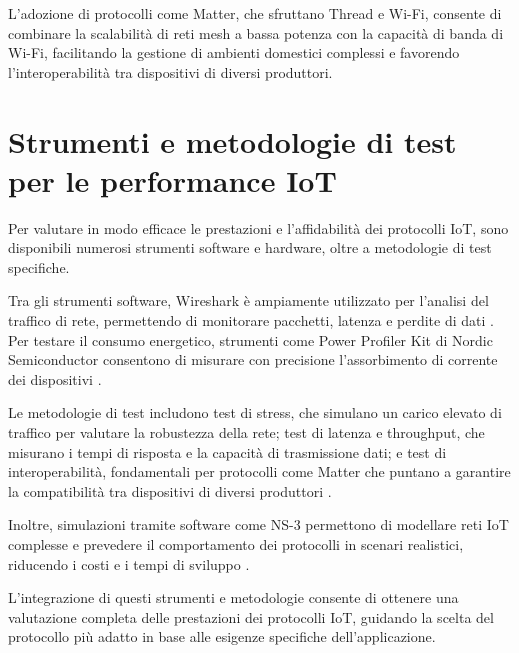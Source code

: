 L’adozione di protocolli come Matter, che sfruttano Thread e Wi-Fi, consente di combinare la scalabilità di reti mesh a bassa potenza con la capacità di banda di Wi-Fi, facilitando la gestione di ambienti domestici complessi e favorendo l’interoperabilità tra dispositivi di diversi produttori.

\section{Strumenti e metodologie di test per le performance IoT}
Per valutare in modo efficace le prestazioni e l’affidabilità dei protocolli IoT, sono disponibili numerosi strumenti software e hardware, oltre a metodologie di test specifiche.

Tra gli strumenti software, Wireshark è ampiamente utilizzato per l’analisi del traffico di rete, permettendo di monitorare pacchetti, latenza e perdite di dati \cite{WiresharkTool}. Per testare il consumo energetico, strumenti come Power Profiler Kit di Nordic Semiconductor consentono di misurare con precisione l’assorbimento di corrente dei dispositivi \cite{PowerProfiler}.

Le metodologie di test includono test di stress, che simulano un carico elevato di traffico per valutare la robustezza della rete; test di latenza e throughput, che misurano i tempi di risposta e la capacità di trasmissione dati; e test di interoperabilità, fondamentali per protocolli come Matter che puntano a garantire la compatibilità tra dispositivi di diversi produttori \cite{IoTTestingMethods}.

Inoltre, simulazioni tramite software come NS-3 permettono di modellare reti IoT complesse e prevedere il comportamento dei protocolli in scenari realistici, riducendo i costi e i tempi di sviluppo \cite{NS3Simulator}.

L’integrazione di questi strumenti e metodologie consente di ottenere una valutazione completa delle prestazioni dei protocolli IoT, guidando la scelta del protocollo più adatto in base alle esigenze specifiche dell’applicazione.
